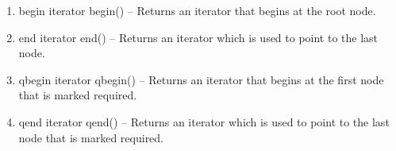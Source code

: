 \begin{enumerate}
\item \begin{detail}
{begin}
{iterator begin()}
{--}
{Returns an iterator that begins at the root node.} 
\end{detail}
\item \begin{detail}
{end}
{iterator end()}
{--}
{Returns an iterator which is used to point to the last node.} 
\end{detail}
\item \begin{detail}
{qbegin}
{iterator qbegin()}
{--}
{Returns an iterator that begins at the first node that is marked required.} 
\end{detail}
\item \begin{detail}
{qend}
{iterator qend()}
{--}
{Returns an iterator which is used to point to the last node that is marked required.} 
\end{detail}
\end{enumerate}



